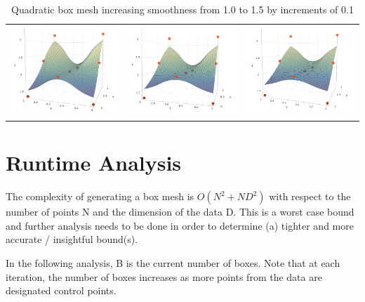 \documentclass[11pt,margin=1in]{article}
\begin{document}
\begin{table}[!htbp]
  \centering
  \begin{tabular}{ccc}
    \includegraphics[width=5cm]{Quad-1-3} & \includegraphics[width=5cm]{Quad-1-4} & \includegraphics[width=5cm]{Quad-1-5} \\
  \end{tabular}
  \caption{Quadratic box mesh increasing smoothness from 1.0 to 1.5 by
    increments of 0.1}
\end{table}  

\section{Runtime Analysis}

The complexity of generating a box mesh is $O(N^2 + N D^2)$ with
respect to the number of points N and the dimension of the data
D. This is a worst case bound and further analysis needs to be done
in order to determine (a) tighter and more accurate / insightful bound(s).

In the following analysis, B is the current number of boxes. Note that
at each iteration, the number of boxes increases as more points from
the data are designated control points.
\end{document}
